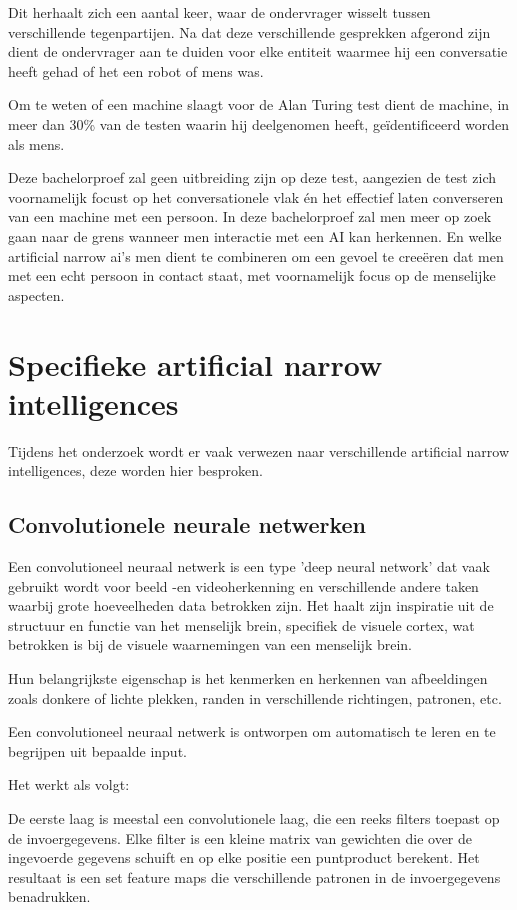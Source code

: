 Dit herhaalt zich een aantal keer, waar de ondervrager wisselt tussen verschillende tegenpartijen. Na dat deze verschillende gesprekken afgerond zijn dient de ondervrager aan te duiden voor elke entiteit waarmee hij een conversatie heeft gehad of het een robot of mens was.

Om te weten of een machine slaagt voor de Alan Turing test dient de machine, in meer dan 30\% van de testen waarin hij deelgenomen heeft, geïdentificeerd worden als mens. 

Deze bachelorproef zal geen uitbreiding zijn op deze test, aangezien de test zich voornamelijk focust op het conversationele vlak én het effectief laten converseren van een machine met een persoon. In deze bachelorproef zal men meer op zoek gaan naar de grens wanneer men interactie met een AI kan herkennen. En welke artificial narrow ai's men dient te combineren om een gevoel te creeëren dat men met een echt persoon in contact staat, met voornamelijk focus op de menselijke aspecten.

\section{Specifieke artificial narrow intelligences}

Tijdens het onderzoek wordt er vaak verwezen naar verschillende artificial narrow intelligences, deze worden hier besproken.

\subsection{Convolutionele neurale netwerken}

Een convolutioneel neuraal netwerk is een type 'deep neural network' dat vaak gebruikt wordt voor beeld -en videoherkenning en verschillende andere taken waarbij grote hoeveelheden data betrokken zijn. Het haalt zijn inspiratie uit de structuur en functie van het menselijk brein, specifiek de visuele cortex, wat betrokken is bij de visuele waarnemingen van een menselijk brein.

Hun belangrijkste eigenschap is het kenmerken en herkennen van afbeeldingen zoals donkere of lichte plekken, randen in verschillende richtingen, patronen, etc.

Een convolutioneel neuraal netwerk is ontworpen om automatisch te leren en te begrijpen uit bepaalde input. 

Het werkt als volgt: 

De eerste laag is meestal een convolutionele laag, die een reeks filters toepast op de invoergegevens. Elke filter is een kleine matrix van gewichten die over de ingevoerde gegevens schuift en op elke positie een puntproduct berekent. Het resultaat is een set feature maps die verschillende patronen in de invoergegevens benadrukken.

